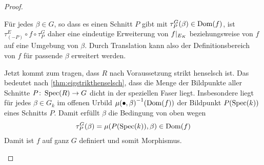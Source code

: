 \begin{Lemma}
\begin{proof}
\begin{description}
      Für jedes $\beta\in G$, so dass es einen Schnitt $P$ gibt mit
      ${\tau_P^G(\beta)\in\operatorname{Dom}(f)}$, ist ${\tau_{(-P)}^E\circ f\circ
      \tau_P^G}$ daher eine eindeutige Erweiterung von $f|_{E_{K}}$
      beziehungsweise von $f$ auf eine Umgebung von $\beta$.
      Durch Translation kann also der Definitionsbereich von $f$ für
      passende $\beta$ erweitert werden. 

      Jetzt kommt zum tragen, dass $R$ nach Voraussetzung strikt
      henselsch ist. Das bedeutet nach
      \ref{thm:eigstrikthenselsch}, dass die Menge der Bildpunkte
      aller Schnitte ${P\colon\operatorname{Spec}(R)\to G}$ dicht in der
      speziellen Faser liegt.
      Insbesondere liegt für jedes $\beta\in G_k$ im offenen Urbild
      ${\mu(\bullet,\beta)}^{-1}(\operatorname{Dom}(f))$ der Bildpunkt $P(\operatorname{Spec}(k))$
      eines Schnitts $P$. Damit erfüllt $\beta$ die Bedingung von oben
      wegen
      \begin{gather*}
        \tau_P^G(\beta)=\mu(P(\operatorname{Spec}(k)),\beta)\in\operatorname{Dom}(f)
      \end{gather*}
      Damit ist $f$ auf ganz $G$ definiert und somit Morphismus.
      \qedhere
    \end{description}
  \end{proof}
\end{Lemma}


